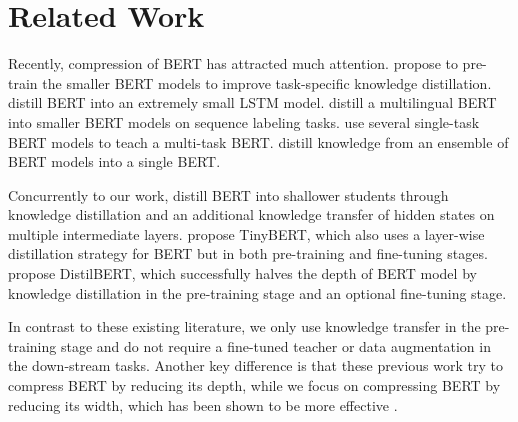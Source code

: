 \documentclass[11pt,a4paper]{article}
\begin{document}
\section{Related Work}



Recently, compression of BERT has attracted much attention. \citet{turc2019well} propose to pre-train the smaller BERT models to improve task-specific knowledge distillation. \citet{tang2019distilling} distill BERT into an extremely small LSTM model. \citet{tsai2019small} distill a multilingual BERT into smaller BERT models on sequence labeling tasks.
\citet{clark2019bam} use several single-task BERT models to teach a multi-task BERT. \citet{liu2019multi} distill knowledge from an ensemble of BERT models into a single BERT.

Concurrently to our work, \citet{sun2019patient} distill BERT into shallower students through knowledge distillation and an additional knowledge transfer of hidden states on multiple intermediate layers. \citet{jiao2019tinybert} propose TinyBERT, which also uses a layer-wise distillation strategy for BERT but in both pre-training and fine-tuning stages. \citet{sanh2019distilbert} propose DistilBERT, which successfully halves the depth of BERT model by knowledge distillation in the pre-training stage and an optional fine-tuning stage.


In contrast to these existing literature, we only use knowledge transfer in the pre-training stage and do not require a fine-tuned teacher or data augmentation \cite{wu2019conditional} in the down-stream tasks. Another key difference is that these previous work try to compress BERT by reducing its depth, while we focus on compressing BERT by reducing its width, which has been shown to be more effective \cite{turc2019well}. 











\newcommand{\blockl}[4]{\multirow{10}{*}{
#3}
}

\newcommand{\blockb}[4]{\multirow{10}{*}{
#3}
}

\newcommand{\blockx}[4]{\multirow{10}{*}{
#3}
}

\newcommand{\blockxx}[4]{\multirow{10}{*}{
#3}
}

\newcommand{\blockxxx}[4]{\multirow{10}{*}{
#3}
}
\end{document}
